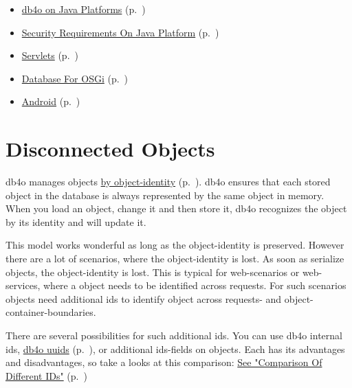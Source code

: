\begin{itemize}
\item \hyperref[ref:platform-specific-issues-db4o-on-java-platforms]{db4o on Java Platforms} (p.~\pageref{ref:platform-specific-issues-db4o-on-java-platforms})
\item \hyperref[ref:platform-specific-issues-security-requirements-on-java-platform]{Security Requirements On Java Platform} (p.~\pageref{ref:platform-specific-issues-security-requirements-on-java-platform})
\item \hyperref[ref:platform-specific-issues-web-servlets]{Servlets} (p.~\pageref{ref:platform-specific-issues-web-servlets})
\item \hyperref[ref:platform-specific-issues-database-for-osgi]{Database For OSGi} (p.~\pageref{ref:platform-specific-issues-database-for-osgi})
\item \hyperref[ref:platform-specific-issues-android]{Android} (p.~\pageref{ref:platform-specific-issues-android})
\end{itemize}

\section{Disconnected Objects}
\label{ref:platform-specific-issues-disconnected-objects}

db4o manages objects \hyperref[ref:basics-identity-concept]{by object-identity} (p.~\pageref{ref:basics-identity-concept}). db4o ensures that each stored object in the database is always represented by the same object in memory. When you load an object, change it and then store it, db4o recognizes the object by its identity and will update it.

This model works wonderful as long as the object-identity is preserved. However there are a lot of scenarios, where the object-identity is lost. As soon as serialize objects, the object-identity is lost. This is typical for web-scenarios or web-services, where a object needs to be identified across requests. For such scenarios objects need additional ids to identify object across requests- and object-container-boundaries.

There are several possibilities for such additional ids. You can use db4o internal ids, \hyperref[ref:advanced-topics-ids-and-uuids]{db4o uuids} (p.~\pageref{ref:advanced-topics-ids-and-uuids}), or additional ids-fields on objects. Each has its advantages and disadvantages, so take a looks at this comparison: \hyperref[ref:platform-specific-issues-disconnected-objects-comparison-of-ids]{See "Comparison Of Different IDs"} (p.~\pageref{ref:platform-specific-issues-disconnected-objects-comparison-of-ids})

